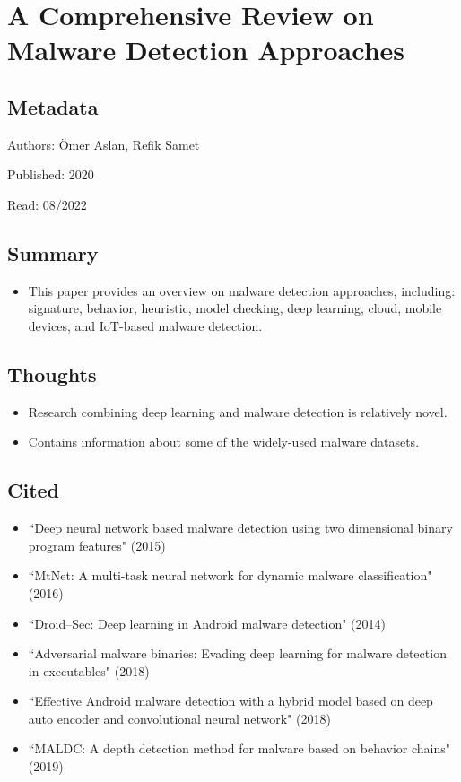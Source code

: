 \documentclass{article}
\begin{document}
\pagebreak


\section*{A Comprehensive Review on Malware Detection Approaches}

\subsection*{Metadata}

\noindent Authors: Ömer Aslan, Refik Samet

\noindent Published: 2020

\noindent Read: 08/2022

\subsection*{Summary}
\begin{itemize}
\item This paper provides an overview on malware detection approaches, including: signature, behavior, heuristic, model checking, deep learning, cloud, mobile devices, and IoT-based malware detection.
\end{itemize}

\subsection*{Thoughts}
\begin{itemize}
\item Research combining deep learning and malware detection is relatively novel.
\item Contains information about some of the widely-used malware datasets.
\end{itemize}

\subsection*{Cited}
\begin{itemize}
\item ``Deep neural network based malware detection using two dimensional binary program features" (2015)
\item ``MtNet: A multi-task neural network for dynamic malware classification" (2016)
\item ``Droid–Sec: Deep learning in Android malware detection" (2014)
\item ``Adversarial malware binaries: Evading deep learning for malware detection in executables" (2018)
\item ``Effective Android malware detection with a hybrid model based on deep auto encoder and convolutional neural network" (2018)
\item ``MALDC: A depth detection method for malware based on behavior chains" (2019)
\end{itemize}
\end{document}
